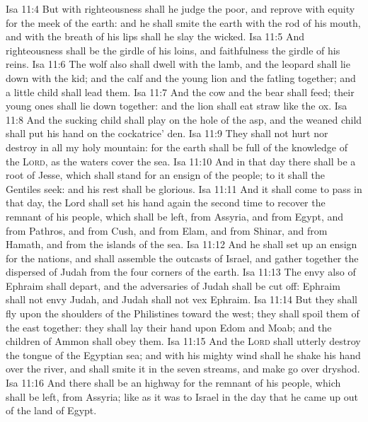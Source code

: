 \vs Isa 11:4 But with righteousness shall he judge the poor, and reprove with equity for the meek of the earth: and he shall smite the earth with the rod of his mouth, and with the breath of his lips shall he slay the wicked.
\vs Isa 11:5 And righteousness shall be the girdle of his loins, and faithfulness the girdle of his reins.
\vs Isa 11:6 The wolf also shall dwell with the lamb, and the leopard shall lie down with the kid; and the calf and the young lion and the fatling together; and a little child shall lead them.
\vs Isa 11:7 And the cow and the bear shall feed; their young ones shall lie down together: and the lion shall eat straw like the ox.
\vs Isa 11:8 And the sucking child shall play on the hole of the asp, and the weaned child shall put his hand on the cockatrice' den.
\vs Isa 11:9 They shall not hurt nor destroy in all my holy mountain: for the earth shall be full of the knowledge of the \textsc{Lord}, as the waters cover the sea.
\vs Isa 11:10 And in that day there shall be a root of Jesse, which shall stand for an ensign of the people; to it shall the Gentiles seek: and his rest shall be glorious.
\vs Isa 11:11 And it shall come to pass in that day,  the Lord shall set his hand again the second time to recover the remnant of his people, which shall be left, from Assyria, and from Egypt, and from Pathros, and from Cush, and from Elam, and from Shinar, and from Hamath, and from the islands of the sea.
\vs Isa 11:12 And he shall set up an ensign for the nations, and shall assemble the outcasts of Israel, and gather together the dispersed of Judah from the four corners of the earth.
\vs Isa 11:13 The envy also of Ephraim shall depart, and the adversaries of Judah shall be cut off: Ephraim shall not envy Judah, and Judah shall not vex Ephraim.
\vs Isa 11:14 But they shall fly upon the shoulders of the Philistines toward the west; they shall spoil them of the east together: they shall lay their hand upon Edom and Moab; and the children of Ammon shall obey them.
\vs Isa 11:15 And the \textsc{Lord} shall utterly destroy the tongue of the Egyptian sea; and with his mighty wind shall he shake his hand over the river, and shall smite it in the seven streams, and make  go over dryshod.
\vs Isa 11:16 And there shall be an highway for the remnant of his people, which shall be left, from Assyria; like as it was to Israel in the day that he came up out of the land of Egypt.
